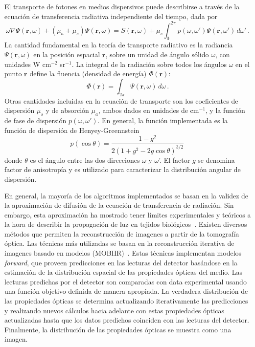 \documentclass[a4paper,10pt]{article}
\begin{document}
El transporte de fotones en medios dispersivos puede describirse a 
través de la ecuación de transferencia radiativa independiente del tiempo, 
dada por
\begin{equation}
 \omega\nabla\Psi(\mathbf{r},\omega)+(\mu_a+\mu_s)\Psi(\mathbf{r},\omega)
 =S(\mathbf{r},\omega) + 
 \mu_s\int_0^{2\pi}p(\omega,\omega')\Psi(\mathbf{r},\omega')\,d\omega'\,.
\label{eq:transf-rad}
\end{equation}
La cantidad fundamental en la teoría de transporte radiativo es la
radiancia $\Psi(\mathbf{r},\omega)$ en la posición espacial 
$\mathbf{r}$, sobre un unidad de ángulo sólido $\omega$, con unidades 
W cm$^{-2}$ sr$^{-1}$. La integral de la radiación sobre todos los 
ángulos $\omega$ en el punto $\mathbf{r}$ define la fluencia (densidad de 
energía) $\Phi(\mathbf{r})$:
\begin{equation}
 \Phi(\mathbf{r})=\int_{2\pi}\Psi(\mathbf{r},\omega)\,d\omega\,.
\end{equation}
Otras cantidades incluidas en la ecuación de transporte son los 
coeficientes de dispersión $\mu_s$ y de absorción $\mu_a$, ambos dados 
en unidades de cm$^{-1}$, y la función de fase de dispersión 
$p(\omega,\omega')$. En general, la función implementada es la función de
 dispersión de Henyey-Greennstein
\begin{equation}
 p(\cos\theta)=\frac{1-g^2}{2(1+g^2-2g\cos\theta)^{3/2}}\,
\end{equation}
donde $\theta$ es el ángulo entre las dos direcciones $\omega$ y 
$\omega$'. El factor $g$ se denomina factor de anisotropía y es utilizado 
para caracterizar la distribución angular de dispersión.

En general, la mayoría de los algoritmos implementados se basan en la 
validez de la aproximación de difusión de la ecuación de transferencia 
de radiación. Sin embargo, esta aproximación ha mostrado tener límites
experimentales y teóricos a la hora de describir la propagación de luz 
en tejidos biológicos~\cite{Hielscher:98}.
Existen diversos métodos que permiten la reconstrucción de imagenes a partir 
de la tomografía óptica. Las técnicas más utilizadas se basan 
en la reconstrucción iterativa de imagenes basado en modelos 
(MOBIIR)~\cite{Klose:99,Klose:02}.
Estas técnicas implementan modelos {\it forward}, que proveen predicciones
en las lecturas del detector basándose en la estimación de la distribución
espacial de las propiedades ópticas del medio. Las lecturas predichas por 
el detector son comparadas con data experimental usando una función objetivo 
definida de manera apropiada. La verdadera distribución de las propiedades 
ópticas se determina actualizando iterativamente las predicciones y 
realizando nuevos cálculos hacia adelante con estas propiedades ópticas 
actualizadas hasta que los datos predichos coinciden con las lecturas del 
detector. Finalmente, la distribución de las propiedades ópticas se muestra 
como una imagen. 
\end{document}
